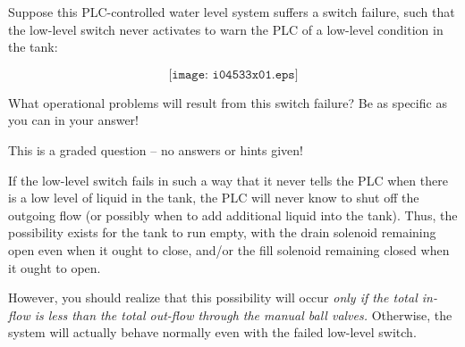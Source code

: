 

Suppose this PLC-controlled water level system suffers a switch failure, such that the low-level switch never activates to warn the PLC of a low-level condition in the tank:

$$\texttt{[image: i04533x01.eps]}$$

What operational problems will result from this switch failure?  Be as specific as you can in your answer!

\vfil 

\eject






This is a graded question -- no answers or hints given!







If the low-level switch fails in such a way that it never tells the PLC when there is a low level of liquid in the tank, the PLC will never know to shut off the outgoing flow (or possibly when to add additional liquid into the tank).  Thus, the possibility exists for the tank to run empty, with the drain solenoid remaining open even when it ought to close, and/or the fill solenoid remaining closed when it ought to open.

\vskip 10pt

However, you should realize that this possibility will occur {\it only if the total in-flow is less than the total out-flow through the manual ball valves.}  Otherwise, the system will actually behave normally even with the failed low-level switch.



